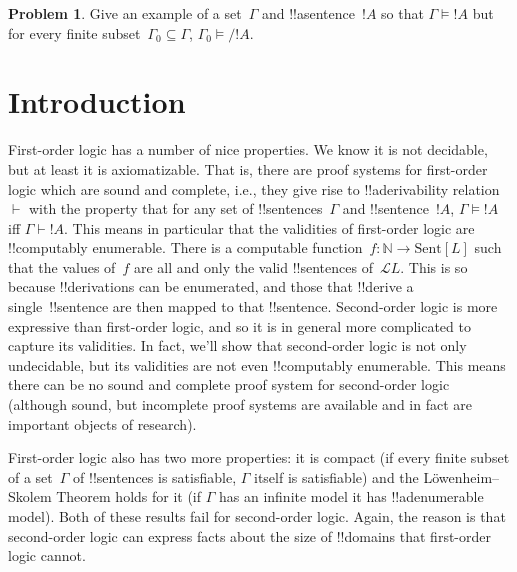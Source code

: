 \documentclass[10pt,a4paper]{article}
\theoremstyle{plain}
\theoremstyle{definition}
\newtheorem{prob}{Problem}[section]
\theoremstyle{remark}
\newcommand*{\olfileid}[3]{}
\newcommand*{\olsection}[1]{\section*{#1}}
\providecommand{\Proves}{\mathrel{\vdash}}
\providecommand{\Entails}{\mathrel{\models}}
\providecommand{\Lang}{\ensuremath{\mathcal{L}}}
\providecommand{\Nat}{\ensuremath{\mathbb{N}}}
\providecommand{\Sent}{\mathrm{Sent}}
\begin{document}
\begin{prob}
Give an example of a set~$\Gamma$ and !!a{sentence}~$!A$ so that
$\Gamma \Entails !A$ but for every finite subset~$\Gamma_0 \subseteq
\Gamma$, $\Gamma_0 \Entails/ !A$.
\end{prob}






\olfileid{sol}{met}{int}

\olsection{Introduction}

First-order logic has a number of nice properties. We know it is not
decidable, but at least it is axiomatizable. That is, there are proof
systems for first-order logic which are sound and complete, i.e., they
give rise to !!a{derivability} relation~$\Proves$ with the property
that for any set of !!{sentence}s~$\Gamma$ and !!{sentence}~$!A$,
$\Gamma \Entails !A$ iff $\Gamma \Proves !A$.  This means in
particular that the validities of first-order logic are !!{computably
  enumerable}. There is a computable function~$f\colon \Nat \to
\Sent[L]$ such that the values of~$f$ are all and only the valid
!!{sentence}s of~$\Lang{L}$. This is so because !!{derivation}s can be
enumerated, and those that !!{derive} a single~!!{sentence} are then
mapped to that !!{sentence}.  Second-order logic is more expressive
than first-order logic, and so it is in general more complicated to
capture its validities.  In fact, we'll show that second-order logic
is not only undecidable, but its validities are not even !!{computably
  enumerable}. This means there can be no sound and complete proof
system for second-order logic (although sound, but incomplete proof
systems are available and in fact are important objects of research).

First-order logic also has two more properties: it is compact (if
every finite subset of a set~$\Gamma$ of !!{sentence}s is satisfiable,
$\Gamma$ itself is satisfiable) and the L\"owenheim--Skolem Theorem
holds for it (if $\Gamma$ has an infinite model it has
!!a{denumerable} model). Both of these results fail for second-order
logic. Again, the reason is that second-order logic can express facts
about the size of !!{domain}s that first-order logic cannot.


\end{document}
